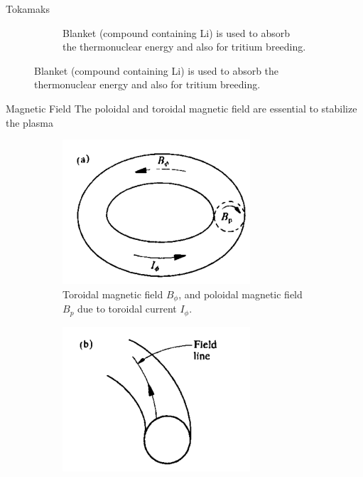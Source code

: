 \begin{frame}{Tokamaks}
\begin{figure}
\begin{subfigure}{0.5\textwidth}
            \caption{Blanket (compound containing Li) is used to absorb the thermonuclear energy and also for tritium breeding.}
        \end{subfigure}
    \end{figure}
\end{frame}

\begin{frame}{Magnetic Field}
    The poloidal and toroidal magnetic field are essential to stabilize the plasma
    \begin{figure}
        \centering
        \begin{subfigure}{0.45\textwidth}
            \centering
            \includegraphics[width=\textwidth]{figures/tokamak-magnetic-field-a.png}
            \caption{Toroidal magnetic field $B_\phi$, and poloidal magnetic field $B_p$ due to toroidal current $I_\phi$.}
        \end{subfigure}%
        \begin{subfigure}{0.45\textwidth}
            \centering
            \includegraphics[width=\textwidth]{figures/tokamak-magnetic-field-b.png}

\end{subfigure}
\end{figure}
\end{frame}
